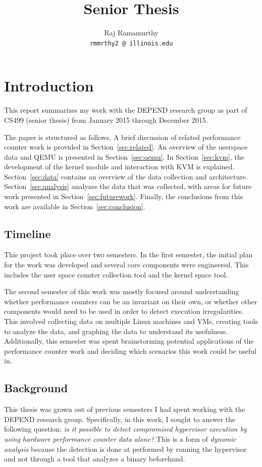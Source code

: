 \documentclass[notitlepage]{article}
\begin{document}
\title{Senior Thesis}
\author{Raj Ramamurthy\\
  \texttt{rmmrthy2 @ illinois.edu}}
\maketitle


\section{Introduction}
\label{sec:intro} This report summarizes my work with the DEPEND research group
as part of CS499 (senior thesis) from January 2015 through December 2015.

The paper is structured as follows. A brief discussion of related performance
counter work is provided in Section~\ref{sec:related}. An overview of the
userspace data and QEMU is presented in Section~\ref{sec:qemu}. In
Section~\ref{sec:kvm}, the development of the kernel module and interaction with
KVM is explained. Section~\ref{sec:data} contains an overview of the data
collection and architecture. Section~\ref{sec:analysis} analyzes the data that
was collected, with areas for future work presented in
Section~\ref{sec:futurework}. Finally, the conclusions from this work are
available in Section~\ref{sec:conclusion}.

\subsection{Timeline}
This project took place over two semesters. In the first semester, the initial
plan for the work was developed and several core components were engineered.
This includes the user space counter collection tool and the kernel space tool.

The second semester of this work was mostly focused around understanding whether
performance counters can be an invariant on their own, or whether other
components would need to be used in order to detect execution irregularities.
This involved collecting data on multiple Linux machines and VMs, creating tools
to analyze the data, and graphing the data to understand its usefulness.
Additionally, this semester was spent brainstorming potential
applications of the performance counter work and deciding which scenarios this
work could be useful in.

\subsection{Background}
This thesis was grown out of previous semesters I had spent working with the
DEPEND research group. Specifically, in this work,  I sought to answer the
following question: \textit{is it possible to detect compromised hypervisor
    execution by using hardware performance counter data alone?} This is a form
    of \textit{dynamic analysis} because the detection is done at performed by
    running the hypervisor and not through a tool that analyzes a binary
    beforehand.
\end{document}

